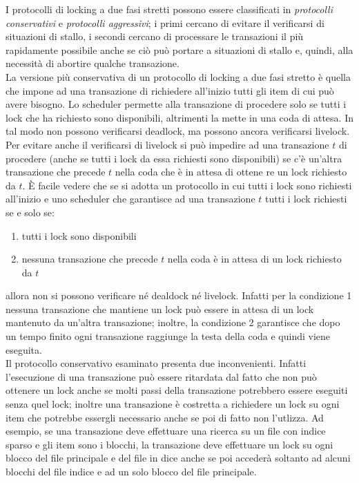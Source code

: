 I protocolli di locking a due fasi stretti possono essere classificati in \emph{protocolli conservativi} e
\emph{protocolli aggressivi}; i primi cercano di evitare il verificarsi di situazioni di stallo, i secondi cercano
di processare le transazioni il più rapidamente possibile anche se ciò può portare a situazioni di
stallo e, quindi, alla necessità di abortire qualche transazione.\\

La versione più conservativa di un protocollo di locking a due fasi stretto è quella che impone ad
una transazione di richiedere all'inizio tutti gli item di cui può avere bisogno. Lo scheduler permette
alla transazione di procedere solo se tutti i lock che ha richiesto sono disponibili, altrimenti la mette
in una coda di attesa. In tal modo non possono verificarsi deadlock, ma possono ancora verificarsi
livelock. Per evitare anche il verificarsi di livelock si può impedire ad una transazione $t$ di
procedere (anche se tutti i lock da essa richiesti sono disponibili) se c'è un'altra transazione che
precede $t$ nella coda che è in attesa di ottene re un lock richiesto da $t$. \`E facile vedere che se si
adotta un protocollo in cui tutti i lock sono richiesti all'inizio e uno scheduler che garantisce ad una
transazione $t$ tutti i lock richiesti se e solo se:
\begin{enumerate}
 \item tutti i lock sono disponibili
 \item nessuna transazione che precede $t$ nella coda è in attesa di un lock richiesto da $t$
\end{enumerate}
allora non si possono verificare né dealdock né livelock. Infatti per la condizione 1 nessuna
transazione che mantiene un lock può essere in attesa di un lock mantenuto da un'altra transazione;
inoltre, la condizione 2 garantisce che dopo un tempo finito ogni transazione raggiunge la testa della
coda e quindi viene eseguita.\\

Il protocollo conservativo esaminato presenta due inconvenienti. Infatti l'esecuzione di una
transazione può essere ritardata dal fatto che non può ottenere un lock anche se molti passi della
transazione potrebbero essere eseguiti senza quel lock; inoltre una transazione è costretta a
richiedere un lock su ogni item che potrebbe essergli necessario anche se poi di fatto non l'utlizza.
Ad esempio, se una transazione deve effettuare una ricerca su un file con indice sparso e gli item
sono i blocchi, la transazione deve effettuare un lock su ogni blocco del file principale e del file
in dice anche se poi accederà soltanto ad alcuni blocchi del file indice e ad un solo blocco del file
principale.\\


